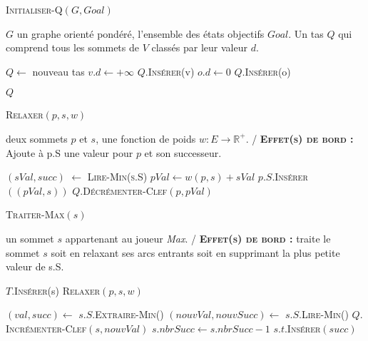 

\begin{algorithm}
	\caption{\textsc {Initialiser-Q}$(G,Goal)$}
	 \label{algo:initQ}
	\begin{algorithmic}[1]
		\REQUIRE $G$ un graphe orienté pondéré, l'ensemble des états objectifs $Goal$.
		\ENSURE Un tas $Q$ qui comprend tous les sommets de $V$ classés par leur valeur $d$.
		
		\STATE $Q \leftarrow$ nouveau tas 
			\STATE $v.d \leftarrow +\infty$
			\STATE $Q.$\textsc{Insérer}(v)
		\ENDFOR
			\STATE $o.d \leftarrow 0$
			\STATE $Q.$\textsc{Insérer}(o)	
		\ENDFOR
		
		\RETURN $Q$
	
			
\end{algorithmic}
		
\end{algorithm}


\begin{algorithm}
	\caption{\textsc {Relaxer}$(p,s,w)$}
	 \label{algo:relaxerMinMax}
	\begin{algorithmic}[1]
		\REQUIRE deux sommets $p$ et $s$, une fonction de poids $w : E \rightarrow \mathbb{R}^{+}$.
		\ENSURE / \textbf{\textsc{Effet(s) de bord :}} Ajoute à p.S une valeur pour $p$ et son successeur.
		
		\STATE $(sVal,succ)$ $\leftarrow$ \textsc{Lire-Min(s.S)}
		\STATE $pVal \leftarrow w(p,s) + sVal$
		\STATE $p.S.$\textsc{Insérer}$((pVal,s))$
		\STATE $Q.$\textsc{Décrémenter-Clef}$(p,pVal)$
			
\end{algorithmic}
		
\end{algorithm}


\begin{algorithm}
	\caption{\textsc {Traiter-Max}$(s)$}
	 \label{algo:traiterMax}
	\begin{algorithmic}[1]
		\REQUIRE un sommet $s$ appartenant au joueur \textit{Max}.
		\ENSURE / \textbf{\textsc{Effet(s) de bord :}} traite le sommet $s$ soit en relaxant ses arcs entrants soit en supprimant la plus petite valeur de s.S.
		
			\STATE $T.$\textsc{Insérer}(s)
				\STATE \textsc{Relaxer}$(p,s,w)$
			\ENDFOR
			
		\ELSE
			\STATE $(val,succ) \leftarrow$ $s.S.$\textsc{Extraire-Min}()
			\STATE $(nouvVal,nouvSucc) \leftarrow$ $s.S.$\textsc{Lire-Min}()
			\STATE $Q.$\textsc{Incrémenter-Clef}$(s,nouvVal)$
			\STATE $s.nbrSucc \leftarrow s.nbrSucc - 1 $
			\STATE $s.t.$\textsc{Insérer}$(succ)$
		\ENDIF
			
				
			
\end{algorithmic}
		
\end{algorithm}

